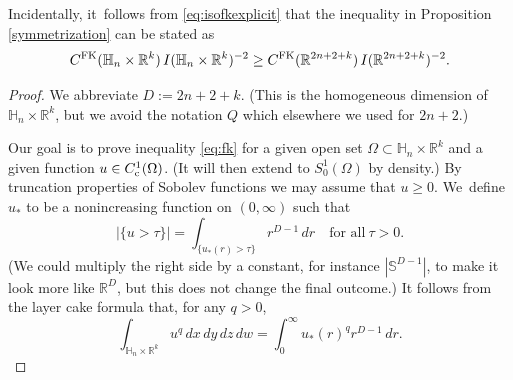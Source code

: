 \documentclass[JEP,XML,SOM,Unicode,published]{cedram}
\newcommand{\rc}{\textup{c}}
\newcommand{\FK}{\textup{FK}}
\theoremstyle{definition}
\newcommand{\1}{\mathbbm{1}}
\newcommand{\R}{\mathbb{R}}
\newcommand{\Sph}{\mathbb{S}}
\begin{document}
Incidentally, it~follows from \eqref{eq:isofkexplicit} that the inequality in Proposition \ref{symmetrization} can be stated as
\begin{equation}
\label{eq:symmetrization}
C^\FK(\mathbb H_n\times\R^k)\,I(\mathbb H_n\times\R^k)^{-2} \geq
C^\FK(\R^{2n+2+k}) \,I(\mathbb R^{2n+2+k})^{-2}.
\end{equation}

\begin{proof}
We abbreviate $D := 2n+2+k$. (This is the homogeneous dimension of $\mathbb H_n\times\R^k$, but we avoid the notation $Q$ which elsewhere we used for $2n+2$.)

Our goal is to prove inequality \eqref{eq:fk} for a given open set $\Omega\subset\mathbb H_n\times\R^k$ and a given function $u\in C^1_\rc(\Omega)$. (It will then extend to $S^1_0(\Omega)$ by density.) By truncation properties of Sobolev functions we may assume that $u\geq 0$. We~define $u_*$ to be a nonincreasing function on $(0,\infty)$ such that
\[
|\{ u >\tau \}| = \int_{\{u_*(r)>\tau\}} r^{D-1}\,dr
\quad\text{for all}\ \tau>0.
\]
(We could multiply the right side by a constant, for instance $|\Sph^{D-1}|$, to make it look more like $\R^D$, but this does not change the final outcome.) It follows from the layer cake formula that, for any $q>0$,
\begin{equation}
\label{eq:layercake}
\int_{\mathbb H_n\times\R^k} u^q\,dx\,dy\,dz\,dw = \int_0^\infty u_*(r)^q r^{D-1}\,dr.
\end{equation}


\end{proof}
\end{document}
